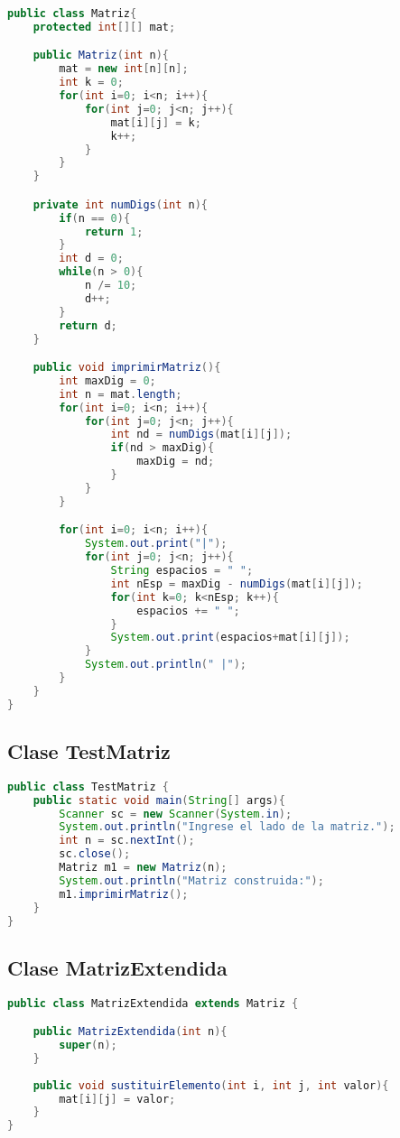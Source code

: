 \documentclass{article}
\begin{document}
\begin{lstlisting}[language=Java]
public class Matriz{
    protected int[][] mat;

    public Matriz(int n){
        mat = new int[n][n];
        int k = 0;
        for(int i=0; i<n; i++){
            for(int j=0; j<n; j++){
                mat[i][j] = k;
                k++;
            }
        }
    }

    private int numDigs(int n){
        if(n == 0){
            return 1;
        }
        int d = 0;
        while(n > 0){
            n /= 10;
            d++;
        }
        return d;
    }

    public void imprimirMatriz(){
        int maxDig = 0;
        int n = mat.length;
        for(int i=0; i<n; i++){
            for(int j=0; j<n; j++){
                int nd = numDigs(mat[i][j]);
                if(nd > maxDig){
                    maxDig = nd;
                }
            }
        }

        for(int i=0; i<n; i++){
            System.out.print("|");
            for(int j=0; j<n; j++){
                String espacios = " ";
                int nEsp = maxDig - numDigs(mat[i][j]);
                for(int k=0; k<nEsp; k++){
                    espacios += " ";
                }
                System.out.print(espacios+mat[i][j]);
            }
            System.out.println(" |");
        }
    }
}
\end{lstlisting}

\subsection{Clase TestMatriz}

\begin{lstlisting}[language=Java]
public class TestMatriz {
    public static void main(String[] args){
        Scanner sc = new Scanner(System.in);
        System.out.println("Ingrese el lado de la matriz.");
        int n = sc.nextInt();
        sc.close();
        Matriz m1 = new Matriz(n);
        System.out.println("Matriz construida:");
        m1.imprimirMatriz();
    }
}
\end{lstlisting}

\subsection{Clase MatrizExtendida}

\begin{lstlisting}[language=Java]
public class MatrizExtendida extends Matriz {

    public MatrizExtendida(int n){
        super(n);
    }
    
    public void sustituirElemento(int i, int j, int valor){
        mat[i][j] = valor;
    }
}
\end{lstlisting}
\end{document}

